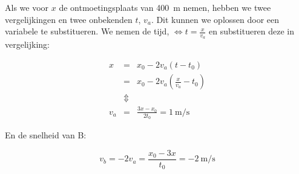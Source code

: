 \documentclass{ximera}
\begin{document}
\begin{exercise}
\begin{oplossing}
\begin{image}[0.5\textwidth]
    \end{image}

    Als we voor $x$ de ontmoetingsplaats van \SI{400}{m} nemen, hebben we twee vergelijkingen en twee onbekenden $t$, $v_a$. 
    Dit kunnen we oplossen door een variabele te substitueren. We nemen de tijd, $\Leftrightarrow t=\frac{x}{v_a}$ en substitueren deze in vergelijking:

    \[
    \begin{array}{rcl}
    x&=&x_0-2v_a(t-t_0)\\
    &=&x_0-2v_a\left(\frac{x}{v_a}-t_0\right)\\
    &\Updownarrow&\\
    v_a&=&\frac{3x-x_0}{2t_0}=\SI{1}{\meter\per\second}
    \end{array}
    \]

    En de snelheid van B:

    \[
    v_b=-2v_a=\frac{x_0-3x}{t_0}= \SI{-2}{\meter\per\second}
    \]

    \end{oplossing}

\end{exercise}
\end{document}
